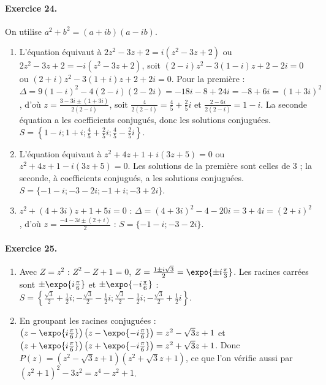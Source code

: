 \begin{corrige}
\paragraph{Exercice 24.}
On utilise $a^2 + b^2 = (a + ib)(a - ib)$.
\begin{enumerate}
\item L'\'equation \'equivaut \`a $2z^2 - 3z + 2 = i(z^2 - 3z + 2)$ ou $2z^2 - 3z + 2 = -i(z^2 - 3z + 2)$, soit
      $(2 - i)z^2 - 3(1 - i)z + 2 - 2i = 0$ ou $(2 + i)z^2 - 3(1 + i)z + 2 + 2i = 0$.
      Pour la premi\`ere : $\Delta = 9(1-i)^2 - 4(2-i)(2-2i) = -18i - 8 + 24i = -8 + 6i = (1 + 3i)^2$, d'o\`u
      $z = \frac{3 - 3i \pm (1 + 3i)}{2(2 - i)}$, soit $\frac{4}{2(2-i)} = \frac{4}{5} + \frac{2}{5}i$ et $\frac{2 - 6i}{2(2-i)} = 1 - i$.
      La seconde \'equation a les coefficients conjugu\'es, donc les solutions conjugu\'ees.
      $S = \left\{1 - i ; 1 + i ; \frac{4}{5} + \frac{2}{5}i ; \frac{4}{5} - \frac{2}{5}i\right\}$.
\item L'\'equation \'equivaut \`a $z^2 + 4z + 1 + i(3z + 5) = 0$ ou $z^2 + 4z + 1 - i(3z + 5) = 0$.
      Les solutions de la premi\`ere sont celles de 3 ; la seconde, \`a coefficients conjugu\'es, a les solutions conjugu\'ees.
      $S = \{-1 - i ; -3 - 2i ; -1 + i ; -3 + 2i\}$.
\item $z^2 + (4 + 3i)z + 1 + 5i = 0$ : $\Delta = (4 + 3i)^2 - 4 - 20i = 3 + 4i = (2 + i)^2$, d'o\`u $z = \frac{-4 - 3i \pm (2 + i)}{2}$ :
      $S = \{-1 - i ; -3 - 2i\}$.
\end{enumerate}

\paragraph{Exercice 25.}
\begin{enumerate}
\item Avec $Z = z^2$ : $Z^2 - Z + 1 = 0$, $Z = \frac{1 \pm i\sqrt{3}}{2} = \expo{\pm i\frac{\pi}{3}}$.
      Les racines carr\'ees sont $\pm\expo{i\frac{\pi}{6}}$ et $\pm\expo{-i\frac{\pi}{6}}$ :
      $S = \left\{\frac{\sqrt{3}}{2} + \frac{1}{2}i ; -\frac{\sqrt{3}}{2} - \frac{1}{2}i ; \frac{\sqrt{3}}{2} - \frac{1}{2}i ; -\frac{\sqrt{3}}{2} + \frac{1}{2}i\right\}$.
\item En groupant les racines conjugu\'ees : $\left(z - \expo{i\frac{\pi}{6}}\right)\left(z - \expo{-i\frac{\pi}{6}}\right) = z^2 - \sqrt{3}z + 1$ et
      $\left(z + \expo{i\frac{\pi}{6}}\right)\left(z + \expo{-i\frac{\pi}{6}}\right) = z^2 + \sqrt{3}z + 1$.
      Donc $P(z) = (z^2 - \sqrt{3}z + 1)(z^2 + \sqrt{3}z + 1)$, ce que l'on v\'erifie aussi par $(z^2 + 1)^2 - 3z^2 = z^4 - z^2 + 1$.
\end{enumerate}


\end{corrige}
